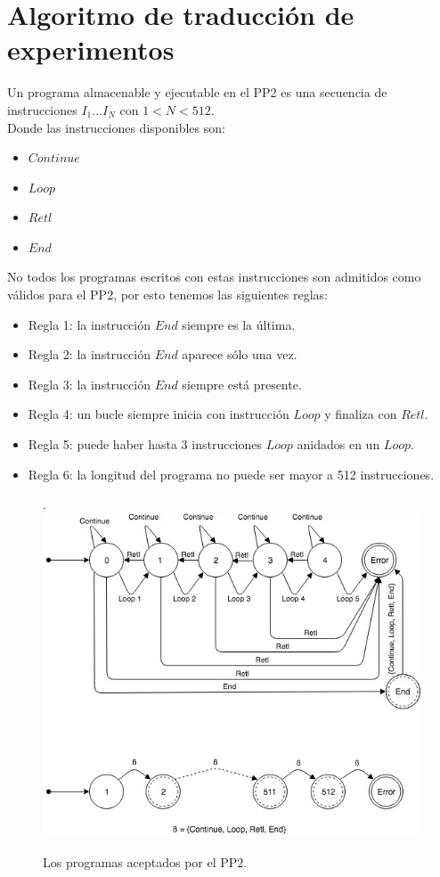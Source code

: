 \section{Algoritmo de traducci\'on de experimentos}

Un programa almacenable y ejecutable en el PP2 es una secuencia de 
instrucciones \(I_{1} ... I_{N}\) con \(1 < N < 512 \).
\\
Donde las instrucciones disponibles son:

\begin{itemize}
    \item $Continue$
    \item $Loop$
    \item $Retl$
    \item $End$
\end{itemize}

\noindent
No todos los programas escritos con estas instrucciones son admitidos 
como v\'alidos para el PP2, por esto tenemos las siguientes reglas:

\begin{itemize}
\item Regla 1: la instrucci\'on $End$ siempre es la \'ultima.
\item Regla 2: la instrucci\'on $End$ aparece s\'olo una vez.
\item Regla 3: la instrucci\'on $End$ siempre est\'a presente.
\item Regla 4: un bucle siempre inicia con instrucci\'on $Loop$ y finaliza con $Retl$.
\item Regla 5: puede haber hasta 3 instrucciones $Loop$ anidados en un $Loop$.
\item Regla 6: la longitud del programa no puede ser mayor a 512 instrucciones.
\end{itemize}

\begin{figure}[!htb].
    \includegraphics[width=\linewidth]{../figures/d12.jpg}
    \caption{Los programas aceptados por el PP2.}
    \label{fig:d12}
\end{figure}
 
